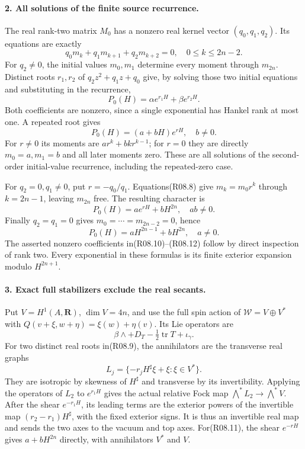 \paragraph{2. All solutions of the finite source recurrence.}
The real rank-two matrix $M_0$ has a nonzero real kernel
vector $(q_0,q_1,q_2)$. Its equations are exactly
\[
          q_0m_k+q_1m_{k+1}+q_2m_{k+2}=0,
                               \quad0\le k\le2n-2.          \tag{R08.8}
\]
For $q_2\ne0$, the initial values $m_0,m_1$ determine every
moment through $m_{2n}$. Distinct roots $r_1,r_2$ of
$q_2z^2+q_1z+q_0$ give, by solving those two initial
equations and substituting in the recurrence,
\[
                   P_0(H)=\alpha e^{r_1H}+\beta e^{r_2H}.
                                                               \tag{R08.9}
\]
Both coefficients are nonzero, since a single exponential
has Hankel rank at most one. A repeated root gives
\[
                      P_0(H)=(a+bH)e^{rH},\quad b\ne0.       \tag{R08.10}
\]
For $r\ne0$ its moments are $ar^k+bk r^{k-1}$; for $r=0$
they are directly $m_0=a,m_1=b$ and all later moments zero.
These are all solutions of the second-order initial-value
recurrence, including the repeated-zero case.

For $q_2=0,q_1\ne0$, put $r=-q_0/q_1$. Equations(R08.8)
give $m_k=m_0r^k$ through $k=2n-1$, leaving $m_{2n}$ free.
The resulting character is
\[
                        P_0(H)=a e^{rH}+bH^{2n},\quad ab\ne0.
                                                               \tag{R08.11}
\]
Finally $q_2=q_1=0$ gives $m_0=\cdots=m_{2n-2}=0$, hence
\[
                        P_0(H)=aH^{2n-1}+bH^{2n},\quad a\ne0.
                                                               \tag{R08.12}
\]
The asserted nonzero coefficients in(R08.10)--(R08.12) follow
by direct inspection of rank two. Every exponential in these
formulas is its finite exterior expansion modulo $H^{2n+1}$.

\paragraph{3. Exact full stabilizers exclude the real secants.}
Put $V=H^1(A,\mathbf R)$, $\dim V=4n$, and use the full
spin action of $\mathcal W=V\oplus V^*$ with
$Q(v+\xi,w+\eta)=\xi(w)+\eta(v)$. Its Lie operators are
\[
          \beta\wedge+D_T-\tfrac12\operatorname{tr}T
                          +\iota_\gamma.                    \tag{R08.13}
\]
For two distinct real roots in(R08.9), the annihilators are
the transverse real graphs
\[
     L_j=\{-r_jH^\sharp\xi+\xi:\xi\in V^*\}.
\]
They are isotropic by skewness of $H^\sharp$ and transverse
by its invertibility. Applying the operators of $L_2$ to
$e^{r_1H}$ gives the actual relative Fock map
$\bigwedge^*L_2\to\bigwedge^*V$. After the shear $e^{-r_1H}$,
its leading terms are the exterior powers of the invertible
map $(r_2-r_1)H^\sharp$, with the fixed exterior signs.
It is thus an invertible real map and sends the two axes to
the vacuum and top axes. For(R08.11), the shear $e^{-rH}$
gives $a+bH^{2n}$ directly, with annihilators $V^*$ and $V$.

